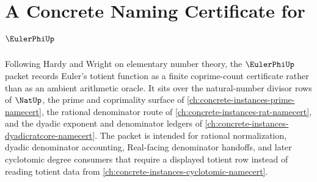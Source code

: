 \chapter{A Concrete Naming Certificate for $\EulerPhiUp$}
\label{ch:concrete-instances-euler-phi-namecert}

Following Hardy and Wright on elementary number theory, the $\EulerPhiUp$ packet records Euler's totient function as a finite coprime-count certificate rather than as an ambient arithmetic oracle. It sits over the natural-number divisor rows of $\NatUp$, the prime and coprimality surface of \autoref{ch:concrete-instances-prime-namecert}, the rational denominator route of \autoref{ch:concrete-instances-rat-namecert}, and the dyadic exponent and denominator ledgers of \autoref{ch:concrete-instances-dyadicratcore-namecert}. The packet is intended for rational normalization, dyadic denominator accounting, Real-facing denominator handoffs, and later cyclotomic degree consumers that require a displayed totient row instead of reading totient data from \autoref{ch:concrete-instances-cyclotomic-namecert}.

